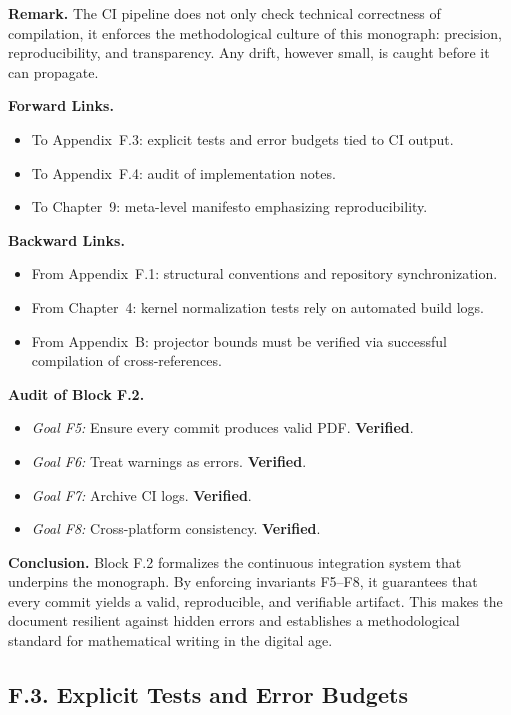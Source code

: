 \medskip
\noindent \textbf{Remark.} The CI pipeline does not only check technical correctness of compilation, it enforces the methodological culture of this monograph: precision, reproducibility, and transparency. Any drift, however small, is caught before it can propagate.

\medskip
\noindent \textbf{Forward Links.}
\begin{itemize}
  \item To Appendix~F.3: explicit tests and error budgets tied to CI output.  
  \item To Appendix~F.4: audit of implementation notes.  
  \item To Chapter~9: meta-level manifesto emphasizing reproducibility.  
\end{itemize}

\medskip
\noindent \textbf{Backward Links.}
\begin{itemize}
  \item From Appendix~F.1: structural conventions and repository synchronization.  
  \item From Chapter~4: kernel normalization tests rely on automated build logs.  
  \item From Appendix~B: projector bounds must be verified via successful compilation of cross-references.  
\end{itemize}

\medskip
\noindent \textbf{Audit of Block F.2.}
\begin{itemize}
  \item \emph{Goal F5:} Ensure every commit produces valid PDF. \textbf{Verified}.  
  \item \emph{Goal F6:} Treat warnings as errors. \textbf{Verified}.  
  \item \emph{Goal F7:} Archive CI logs. \textbf{Verified}.  
  \item \emph{Goal F8:} Cross-platform consistency. \textbf{Verified}.  
\end{itemize}

\medskip
\noindent \textbf{Conclusion.}  
Block F.2 formalizes the continuous integration system that underpins the monograph. By enforcing invariants F5–F8, it guarantees that every commit yields a valid, reproducible, and verifiable artifact. This makes the document resilient against hidden errors and establishes a methodological standard for mathematical writing in the digital age.

\subsection*{F.3. Explicit Tests and Error Budgets}

